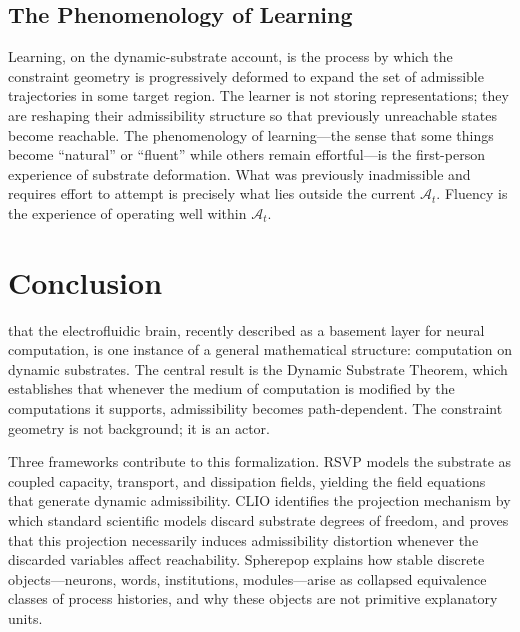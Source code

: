 \documentclass[12pt,a4paper]{article}
\begin{document}
\subsection{The Phenomenology of Learning}

Learning, on the dynamic-substrate account, is the process by which the constraint geometry is progressively deformed to expand the set of admissible trajectories in some target region. The learner is not storing representations; they are reshaping their admissibility structure so that previously unreachable states become reachable. The phenomenology of learning---the sense that some things become ``natural'' or ``fluent'' while others remain effortful---is the first-person experience of substrate deformation. What was previously inadmissible and requires effort to attempt is precisely what lies outside the current $\mathcal{A}_t$. Fluency is the experience of operating well within $\mathcal{A}_t$.

\section{Conclusion}
\label{sec:conclusion} that the electrofluidic brain, recently described as a basement layer for neural computation, is one instance of a general mathematical structure: computation on dynamic substrates. The central result is the Dynamic Substrate Theorem, which establishes that whenever the medium of computation is modified by the computations it supports, admissibility becomes path-dependent. The constraint geometry is not background; it is an actor.

Three frameworks contribute to this formalization. RSVP models the substrate as coupled capacity, transport, and dissipation fields, yielding the field equations that generate dynamic admissibility. CLIO identifies the projection mechanism by which standard scientific models discard substrate degrees of freedom, and proves that this projection necessarily induces admissibility distortion whenever the discarded variables affect reachability. Spherepop explains how stable discrete objects---neurons, words, institutions, modules---arise as collapsed equivalence classes of process histories, and why these objects are not primitive explanatory units.
\end{document}

